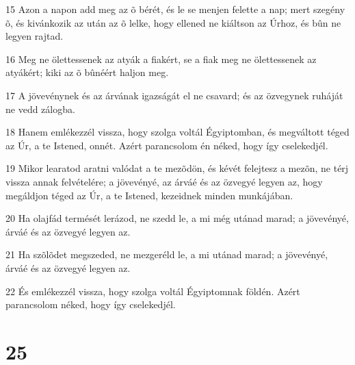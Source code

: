 \par 15 Azon a napon add meg az õ bérét, és le se menjen felette a nap; mert szegény õ, és kivánkozik az után az õ lelke, hogy ellened ne kiáltson az Úrhoz, és bûn ne legyen rajtad.
\par 16 Meg ne ölettessenek az atyák a fiakért, se a fiak meg ne ölettessenek az atyákért; kiki az õ bûnéért haljon meg.
\par 17 A jövevénynek és az árvának igazságát el ne csavard; és az özvegynek ruháját ne vedd zálogba.
\par 18 Hanem emlékezzél vissza, hogy szolga voltál Égyiptomban, és megváltott téged az Úr, a te Istened, onnét. Azért parancsolom én néked, hogy így cselekedjél.
\par 19 Mikor learatod aratni valódat a te mezõdön, és kévét felejtesz a mezõn, ne térj vissza annak felvételére; a jövevényé, az árváé és az özvegyé legyen az, hogy megáldjon téged az Úr, a te Istened, kezeidnek minden munkájában.
\par 20 Ha olajfád termését lerázod, ne szedd le, a mi még utánad marad; a jövevényé, árváé és az özvegyé legyen az.
\par 21 Ha szõlõdet megszeded, ne mezgeréld le, a mi utánad marad; a jövevényé, árváé és az özvegyé legyen az.
\par 22 És emlékezzél vissza, hogy szolga voltál Égyiptomnak földén. Azért parancsolom néked, hogy így cselekedjél.

\chapter{25}

